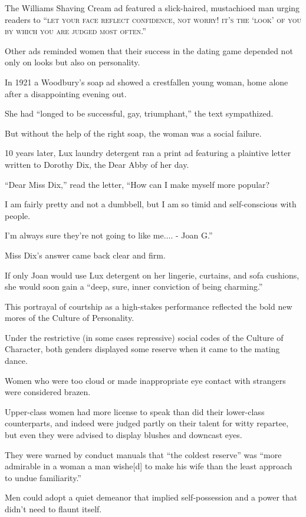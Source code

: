 \documentclass[oneside]{article}
\numberwithin{equation}{section}
\begin{document}
The Williams Shaving Cream ad featured a slick-haired, mustachioed man urging readers to ``\textsc{let your face reflect confidence, not worry! it's the `look' of you by which you are judged most often}.''

%
Other ads reminded women that their success in the dating game depended not only on looks but also on personality.

In 1921 a Woodbury's soap ad showed a crestfallen young woman, home alone after a disappointing evening out.

She had ``longed to be successful, gay, triumphant,'' the text sympathized.

But without the help of the right soap, the woman was a social failure.

%
10 years later, Lux laundry detergent ran a print ad featuring a plaintive letter written to Dorothy Dix, the Dear Abby of her day.

``Dear Miss Dix,'' read the letter, ``How can I make myself more popular?

I am fairly pretty and not a dumbbell, but I am so timid and self-conscious with people.

I'm always sure they're not going to like me$\ldots$. - Joan G.''

%
Miss Dix's answer came back clear and firm.

If only Joan would use Lux detergent on her lingerie, curtains, and sofa cushions, she would soon gain a ``deep, sure, inner conviction of being charming.''

%
This portrayal of courtship as a high-stakes performance reflected the bold new mores of the Culture of Personality.

Under the restrictive (in some cases repressive) social codes of the Culture of Character, both genders displayed some reserve when it came to the mating dance.

Women who were too cloud or made inappropriate eye contact with strangers were considered brazen.

Upper-class women had more license to speak than did their lower-class counterparts, and indeed were judged partly on their talent for witty repartee, but even they were advised to display blushes and downcast eyes.

They were warned by conduct manuals that ``the coldest reserve'' was ``more admirable in a woman a man wishe[d] to make his wife than the least approach to undue familiarity.''

Men could adopt a quiet demeanor that implied self-possession and a power that didn't need to flaunt itself.
\end{document}
